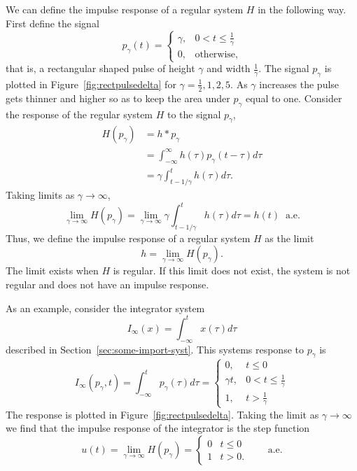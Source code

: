 \documentclass[11pt,a4paper]{book}
\theoremstyle{plain}
\numberwithin{equation}{section}
\begin{document}
We can define the impulse response of a regular system $H$ in the following way.  First define the signal
\[
p_\gamma(t) = \begin{cases}
\gamma, & 0 < t \leq \frac{1}{\gamma} \\
0, & \text{otherwise},
\end{cases}
\]
that is, a rectangular shaped pulse of height $\gamma$ and width $\tfrac{1}{\gamma}$.  The signal $p_\gamma$ is plotted in Figure~\ref{fig:rectpulsedelta} for $\gamma=\frac{1}{2},1,2,5$.  As $\gamma$ increases the pulse gets thinner and higher so as to keep the area under $p_\gamma$ equal to one.  Consider the response of the regular system $H$ to the signal $p_\gamma$,
\begin{align*}
H(p_\gamma) &= h * p_\gamma \\
&= \int_{-\infty}^\infty h(\tau) p_\gamma(t - \tau) d\tau \\
&= \gamma \int_{t- 1/\gamma}^{t} h(\tau) d\tau.
\end{align*}
Taking limits as $\gamma\rightarrow\infty$,
\[
\lim_{\gamma \rightarrow \infty} H(p_\gamma) = \lim_{\gamma \rightarrow \infty} \gamma \int_{t- 1/\gamma}^{t} h(\tau) d\tau = h(t) \;\; \text{a.e.}
\]
Thus, we define the impulse response of a regular system $H$ as the limit  
\begin{equation}\label{eq:defnimpulseresponse}
h = \lim_{\gamma \rightarrow \infty} H(p_\gamma).  
\end{equation}
The limit exists when $H$ is regular.  If this limit does not exist, the system is not regular and does not have an impulse response.  %


As an example, consider the integrator system
\begin{equation}\label{eq:integratorforfigref}
I_\infty(x) = \int_{-\infty}^{t} x(\tau) d\tau
\end{equation}
described in Section~\ref{sec:some-import-syst}.  This systems response to $p_\gamma$ is 
\[
I_\infty(p_\gamma,t) = \int_{-\infty}^{t} p_\gamma(\tau) d\tau = \begin{cases}
0, & t \leq 0 \\
\gamma t, & 0 < t \leq \frac{1}{\gamma} \\
1, & t > \frac{1}{\gamma}
\end{cases}
\]
The response is plotted in Figure~\ref{fig:rectpulsedelta}.  Taking the limit as $\gamma \rightarrow\infty$ we find that the impulse response of the integrator is the step function
\begin{equation}\label{eq:utimprespstep}
u(t) = \lim_{\gamma\rightarrow\infty} H(p_\gamma) = \begin{cases}
0 & t \leq 0 \\
1 & t > 0.
\end{cases} \qquad \text{a.e.}
\end{equation}
\end{document}
